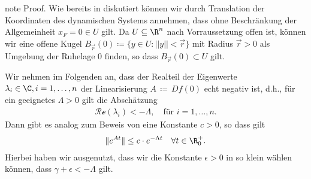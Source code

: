 \documentclass[letterpaper,10pt,english]{jupyterBook}
\begin{document}
\begin{sphinxadmonition}{note}
\sphinxAtStartPar
Proof. Wie bereits in  diskutiert können wir durch Translation der Koordinaten des dynamischen Systems annehmen, dass ohne Beschränkung der Allgemeinheit \(x_F = 0 \in U\) gilt.
Da \(U\subseteq\R^n\) nach Vorraussetzung offen ist, können wir eine offene Kugel \(B_\vec{r}(0) \coloneqq \{y \in U \colon ||y|| < \vec{r}\}\) mit Radius \(\vec{r} > 0\) als Umgebung der Ruhelage \(0\) finden, so dass \(B_\vec{r}(0) \subset U\) gilt.

\sphinxAtStartPar
Wir nehmen im Folgenden an, dass der Realteil der Eigenwerte \(\lambda_i \in \C, i=1,\ldots,n\) der Linearisierung \(A \, \coloneqq \, Df(0)\) echt negativ ist, d.h., für ein geeignetes \(\Lambda > 0\) gilt die Abschätzung
\begin{equation*}
\begin{split}\mathcal{Re}(\lambda_i)< -\Lambda, \quad \text{für } i=1,\ldots,n. \end{split}
\end{equation*}
\sphinxAtStartPar
Dann gibt es analog zum Beweis von {\hyperref[\detokenize{ode_stability/ruhelagen:theorem:stabilit_xe4t_linear}]{}} eine Konstante \(c>0\), so dass gilt
\begin{equation}\label{equation:ode_stability/ruhelagen:eq:abschaetzung_norm_exponential}
\begin{split}\|e^{At}\| \leq c\cdot e^{-\Lambda t}\quad \forall t\in \R^+_0.\end{split}
\end{equation}
\sphinxAtStartPar
Hierbei haben wir ausgenutzt, dass wir die Konstante \(\epsilon > 0\) in  so klein wählen können, dass \(\gamma + \epsilon < -\Lambda\) gilt.


\end{sphinxadmonition}
\end{document}

